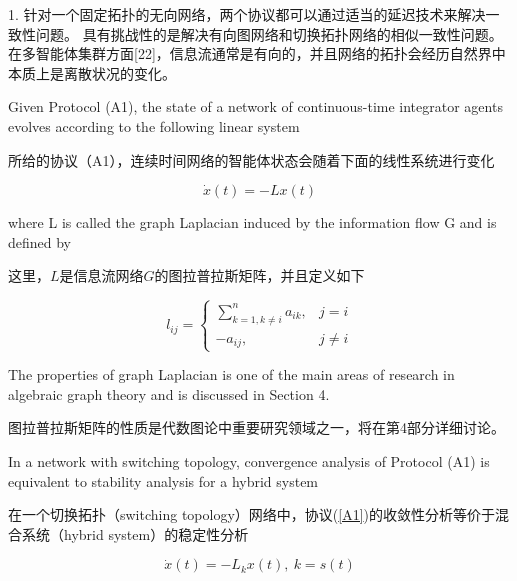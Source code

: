 \documentclass{article}
\begin{document}
 1. 针对一个固定拓扑的无向网络，两个协议都可以通过适当的延迟技术来解决一致性问题。
具有挑战性的是解决有向图网络和切换拓扑网络的相似一致性问题。
在多智能体集群方面[22]，信息流通常是有向的，并且网络的拓扑会经历自然界中本质上是离散状况的变化。

{\color[gray]{0.5}
Given Protocol (A1), the state of a network of continuous-time integrator agents evolves according to the following linear system
}

所给的协议（A1），连续时间网络的智能体状态会随着下面的线性系统进行变化

\begin{equation}
    \dot{x}(t) = -Lx(t) 
    \tag{6}
    \label{6}
\end{equation}


{\color[gray]{0.5}
\noindent where L is called the graph Laplacian induced by the information ﬂow G and is deﬁned by
}

\noindent 这里，$L$是信息流网络$G$的图拉普拉斯矩阵，并且定义如下

\begin{equation}
l_{ij} = \left\{
    \begin{array}{ll}
        \sum_{k=1,k\ne i}^n a_{ik}, & j=i\\
        -a_{ij}, & j\ne i
    \end{array}\right.
    \tag{7}
    \label{7}
\end{equation}

{\color[gray]{0.5}
\noindent The properties of graph Laplacian is one of the main areas of research in algebraic graph theory and is discussed in Section 4.
}

\noindent 图拉普拉斯矩阵的性质是代数图论中重要研究领域之一，将在第4部分详细讨论。

{\color[gray]{0.5}
In a network with switching topology, convergence analysis of Protocol (A1) is equivalent to stability analysis for a hybrid system
}

在一个切换拓扑（switching topology）网络中，协议(\ref{A1})的收敛性分析等价于混合系统（hybrid system）的稳定性分析

\begin{equation}
    \dot{x}(t) = -L_kx(t),\ k=s(t) 
    \tag{8}
    \label{8}
\end{equation}
\end{document}
